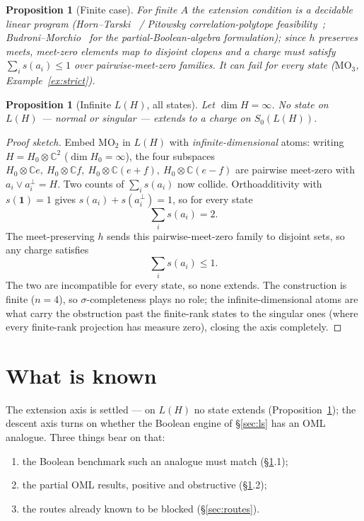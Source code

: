 \documentclass[11pt,reqno]{amsart}
\theoremstyle{plain}
\newtheorem{proposition}[theorem]{Proposition}
\theoremstyle{definition}
\theoremstyle{remark}
\begin{document}
\begin{proposition}[Finite case]\label{prop:finite}
For finite $A$ the extension condition is a decidable linear program
(Horn--Tarski~\cite{HornTarski1948} / Pitowsky correlation-polytope
feasibility~\cite{Pitowsky1989}; Budroni--Morchio~\cite{BudroniMorchio2010}
for the partial-Boolean-algebra formulation); since $h$ preserves meets,
meet-zero elements map to disjoint clopens and a charge must satisfy
$\sum_i s(a_i) \leq 1$ over pairwise-meet-zero families. It can fail for
\emph{every} state ($\mathrm{MO}_3$, Example~\ref{ex:strict}).
\end{proposition}

\begin{proposition}[Infinite $L(H)$, all states]\label{prop:lh}
Let $\dim H = \infty$. \emph{No} state on $L(H)$ --- normal or singular
--- extends to a charge on $S_0(L(H))$.
\end{proposition}

\begin{proof}[Proof sketch]
Embed $\mathrm{MO}_2$ in $L(H)$ with \emph{infinite-dimensional} atoms: writing
$H=H_0\otimes\mathbb C^2$ ($\dim H_0=\infty$), the four subspaces
$H_0\otimes\mathbb Ce,\ H_0\otimes\mathbb Cf,\ H_0\otimes\mathbb C(e{+}f),\
H_0\otimes\mathbb C(e{-}f)$ are pairwise meet-zero with $a_i\vee a_i^\perp=H$. Two
counts of $\sum_i s(a_i)$ now collide. Orthoadditivity with $s(\mathbf 1)=1$ gives
$s(a_i)+s(a_i^\perp)=1$, so for every state
\[
  \sum_i s(a_i)=2 .
\]
The meet-preserving $h$ sends this pairwise-meet-zero family to disjoint sets, so any
charge satisfies
\[
  \sum_i s(a_i)\le 1 .
\]
The two are incompatible for every state, so none extends. The construction is finite
($n=4$), so $\sigma$-completeness plays no role; the infinite-dimensional atoms are what
carry the obstruction past the finite-rank states to the singular ones (where every
finite-rank projection has measure zero), closing the axis completely.
\end{proof}

\section{What is known}
\label{sec:known}

The extension axis is settled --- on $L(H)$ no state extends
(Proposition~\ref{prop:lh}); the descent axis turns on whether the Boolean
engine of \S\ref{sec:ls} has an OML analogue. Three things bear on that:
\begin{enumerate}[label=\textbf{\arabic*.}, noitemsep, topsep=2pt]
  \item the Boolean benchmark such an analogue must match (\S\ref{sec:known}.1);
  \item the partial OML results, positive and obstructive (\S\ref{sec:known}.2);
  \item the routes already known to be blocked (\S\ref{sec:routes}).
\end{enumerate}
\end{document}
